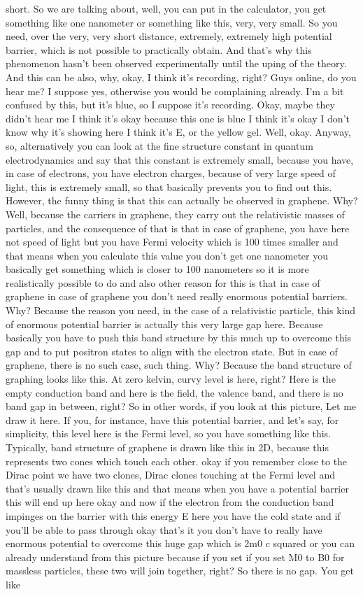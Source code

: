 short. So we are talking about, well, you can put in the calculator, you get something like one nanometer or something like this, very, very small. So you need, over the very, very short distance, extremely, extremely high potential barrier, which is not possible to practically obtain. And that's why this phenomenon hasn't been observed experimentally until the uping of the theory. And this can be also, why, okay, I think it's recording, right? Guys online, do you hear me? I suppose yes, otherwise you would be complaining already. I'm a bit confused by this, but it's blue, so I suppose it's recording. Okay, maybe they didn't hear me I think it's okay because this one is blue I think it's okay I don't know why it's showing here I think it's E, or the yellow gel. Well, okay. Anyway, so, alternatively you can look at the fine structure constant in quantum electrodynamics and say that this constant is extremely small, because you have, in case of electrons, you have electron charges, because of very large speed of light, this is extremely small, so that basically prevents you to find out this. However, the funny thing is that this can actually be observed in graphene. Why? Well, because the carriers in graphene, they carry out the relativistic masses of particles, and the consequence of that is that in case of graphene, you have here not speed of light but you have Fermi velocity which is 100 times smaller and that means when you calculate this value you don't get one nanometer you basically get something which is closer to 100 nanometers so it is more realistically possible to do and also other reason for this is that in case of graphene in case of graphene you don't need really enormous potential barriers. Why? Because the reason you need, in the case of a relativistic particle, this kind of enormous potential barrier is actually this very large gap here. Because basically you have to push this band structure by this much up to overcome this gap and to put positron states to align with the electron state. But in case of graphene, there is no such case, such thing. Why? Because the band structure of graphing looks like this. At zero kelvin, curvy level is here, right? Here is the empty conduction band and here is the field, the valence band, and there is no band gap in between, right? So in other words, if you look at this picture, Let me draw it here. If you, for instance, have this potential barrier, and let's say, for simplicity, this level here is the Fermi level, so you have something like this. Typically, band structure of graphene is drawn like this in 2D, because this represents two cones which touch each other. okay if you remember close to the Dirac point we have two clones, Dirac clones touching at the Fermi level and that's usually drawn like this and that means when you have a potential barrier this will end up here okay and now if the electron from the conduction band impinges on the barrier with this energy E here you have the cold state and if you'll be able to pass through okay that's it you don't have to really have enormous potential to overcome this huge gap which is 2m0 c squared or you can already understand from this picture because if you set if you set M0 to B0 for massless particles, these two will join together, right? So there is no gap. You get like 